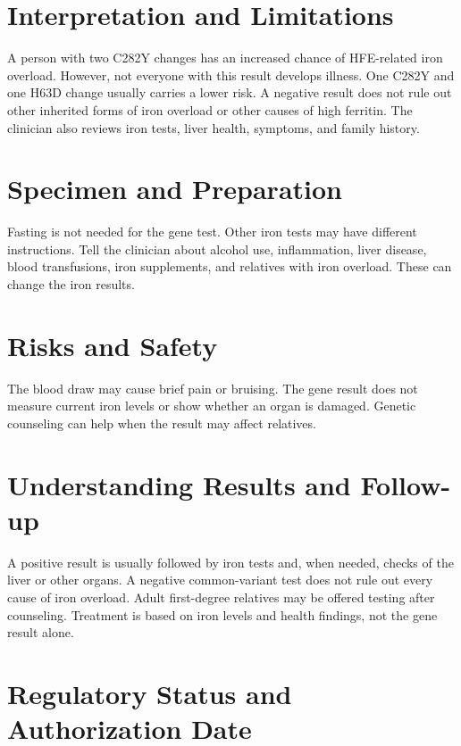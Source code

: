 \section*{Interpretation and Limitations}
A person with two C282Y changes has an increased chance of HFE-related iron overload. However, not everyone with this result develops illness. One C282Y and one H63D change usually carries a lower risk. A negative result does not rule out other inherited forms of iron overload or other causes of high ferritin. The clinician also reviews iron tests, liver health, symptoms, and family history.
\section*{Specimen and Preparation}
Fasting is not needed for the gene test. Other iron tests may have different instructions. Tell the clinician about alcohol use, inflammation, liver disease, blood transfusions, iron supplements, and relatives with iron overload. These can change the iron results.

\section*{Risks and Safety}
The blood draw may cause brief pain or bruising. The gene result does not measure current iron levels or show whether an organ is damaged. Genetic counseling can help when the result may affect relatives.

\section*{Understanding Results and Follow-up}
A positive result is usually followed by iron tests and, when needed, checks of the liver or other organs. A negative common-variant test does not rule out every cause of iron overload. Adult first-degree relatives may be offered testing after counseling. Treatment is based on iron levels and health findings, not the gene result alone.

\section*{Regulatory Status and Authorization Date}

\clearpage
